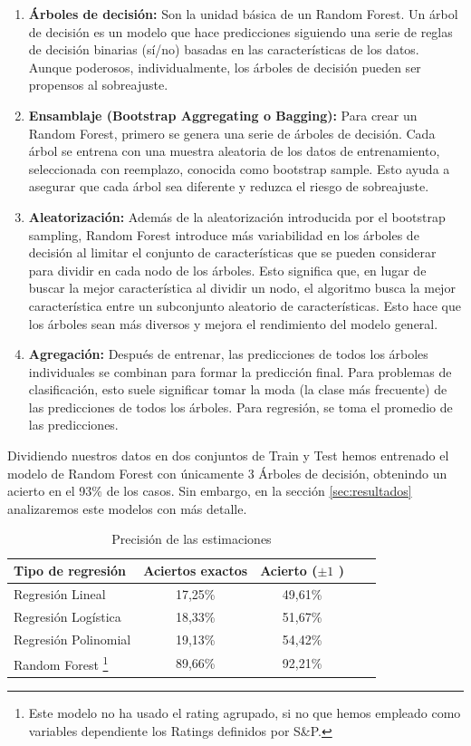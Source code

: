 \documentclass{article}
\begin{document}
\begin{enumerate}
    \item \textbf{Árboles de decisión:} Son la unidad básica de un Random Forest. Un árbol de decisión es un modelo que hace predicciones siguiendo una serie de reglas de decisión binarias (sí/no) basadas en las características de los datos. Aunque poderosos, individualmente, los árboles de decisión pueden ser propensos al sobreajuste.
    \item \textbf{Ensamblaje (Bootstrap Aggregating o Bagging):} Para crear un Random Forest, primero se genera una serie de árboles de decisión. Cada árbol se entrena con una muestra aleatoria de los datos de entrenamiento, seleccionada con reemplazo, conocida como bootstrap sample. Esto ayuda a asegurar que cada árbol sea diferente y reduzca el riesgo de sobreajuste.
    \item \textbf{Aleatorización:} Además de la aleatorización introducida por el bootstrap sampling, Random Forest introduce más variabilidad en los árboles de decisión al limitar el conjunto de características que se pueden considerar para dividir en cada nodo de los árboles. Esto significa que, en lugar de buscar la mejor característica al dividir un nodo, el algoritmo busca la mejor característica entre un subconjunto aleatorio de características. Esto hace que los árboles sean más diversos y mejora el rendimiento del modelo general.
    \item \textbf{Agregación:} Después de entrenar, las predicciones de todos los árboles individuales se combinan para formar la predicción final. Para problemas de clasificación, esto suele significar tomar la moda (la clase más frecuente) de las predicciones de todos los árboles. Para regresión, se toma el promedio de las predicciones.
\end{enumerate}

Dividiendo nuestros datos en dos conjuntos de Train y Test hemos entrenado el modelo de Random Forest con únicamente 3 Árboles de decisión, obtenindo un acierto en el 93\% de los casos. Sin embargo, en la sección \ref{sec:resultados} analizaremos este modelos con más detalle.

\begin{table}[H]
    \centering
    \begin{tabular}{|l|c|c|c|c|}
    \hline
        Tipo de regresión & Aciertos exactos & Acierto ($\pm 1$ ) \\  \hline
        Regresión Lineal & 17,25\% & 49,61\% \\ \hline
        Regresión Logística & 18,33\% & 51,67\%  \\ \hline
        Regresión Polinomial & 19,13\% & 54,42\%\\ \hline
        Random Forest \footnote{Este modelo no ha usado el rating agrupado, si no que hemos empleado como variables dependiente los Ratings definidos por S\&P.} & 89,66\% & 92,21\%\\ \hline
    \end{tabular}
    \caption{Precisión de las estimaciones}
    \label{tab:aciertos}
\end{table}
\end{document}
